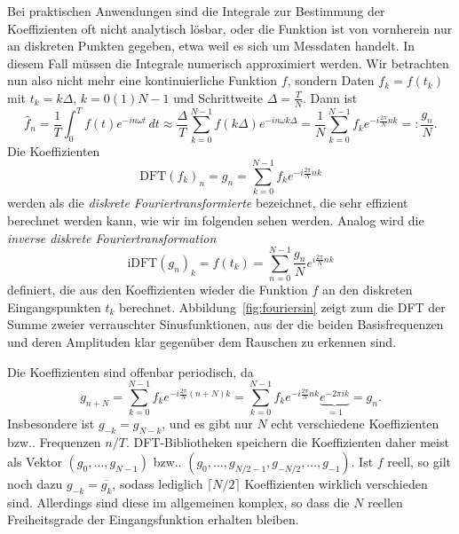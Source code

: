 Bei praktischen Anwendungen sind die Integrale zur Bestimmung der
Koeffizienten oft nicht analytisch lösbar, oder die Funktion ist von
vornherein nur an diskreten Punkten gegeben, etwa weil es sich um
Messdaten handelt. In diesem Fall müssen die Integrale numerisch
approximiert werden. Wir betrachten nun also nicht mehr eine
kontinuierliche Funktion $f$, sondern Daten $f_k = f(t_k)$ mit
$t_k=k\Delta$, $k=0(1)N-1$ und Schrittweite $\Delta =
\frac{T}{N}$. Dann ist
\begin{equation}
  \hat{f}_n = \frac{1}{T}\int_0^T f(t)e^{-i n\omega t}\, dt
  \approx
  \frac{\Delta}{T}\sum_{k=0}^{N-1} f(k\Delta) e^{-i n\omega k\Delta}
  =
  \frac{1}{N}\sum_{k=0}^{N-1} f_k e^{-i\frac{2\pi}{N} n k} =: \frac{g_n}{N}.
\end{equation}
Die Koeffizienten
\begin{equation}
  \label{eq:dft}
  \text{DFT}(f_k)_n = g_n = \sum_{k=0}^{N-1} f_k e^{-i \frac{2\pi}{N} n k}
\end{equation}
werden als die \emph{diskrete Fouriertransformierte} bezeichnet, die
sehr effizient berechnet werden kann, wie wir im folgenden sehen
werden. Analog wird die \emph{inverse diskrete Fouriertransformation}
\begin{equation}
  \label{eq:idft}
  \text{iDFT}(g_n)_k = f(t_k) = \sum_{n=0}^{N-1} \frac{g_n}{N} e^{i \frac{2\pi}{N} n k}
\end{equation}
definiert, die aus den Koeffizienten wieder die Funktion $f$ an den
diskreten Eingangspunkten $t_k$
berechnet. Abbildung~\ref{fig:fouriersin} zeigt zum die DFT der Summe
zweier verrauschter Sinusfunktionen, aus der die beiden
Basisfrequenzen und deren Amplituden klar gegenüber dem Rauschen zu
erkennen sind.

Die Koeffizienten sind offenbar periodisch, da
\begin{equation}
  \label{eq:dftper}
  g_{n+N} = \sum_{k=0}^{N-1} f_k e^{-i\frac{2\pi}{N} (n + N) k} =
  \sum_{k=0}^{N-1} f_k e^{-i\frac{2\pi}{N} n k} \underbrace{e^{-2\pi i k}}_{=1} = g_n.
\end{equation}
Insbesondere ist $g_{-k} = g_{N-k}$, und es gibt nur $N$ echt
verschiedene Koeffizienten bzw.. Frequenzen $n/T$. DFT-Bibliotheken
speichern die Koeffizienten daher meist als Vektor
$(g_{0},\ldots,g_{N-1})$
bzw.. $(g_{0},\ldots,g_{N/2-1},g_{-N/2},\ldots,g_{-1})$.  Ist $f$
reell, so gilt noch dazu $g_{-k} = \overline{g_{k}}$, sodass lediglich
$\lceil N/2\rceil$ Koeffizienten wirklich verschieden sind. Allerdings
sind diese im allgemeinen komplex, so dass die $N$ reellen
Freiheitsgrade der Eingangsfunktion erhalten bleiben.

